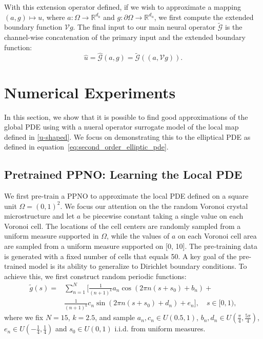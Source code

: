 \documentclass[preprint,11pt]{elsarticle}
\theoremstyle{plain}
\begin{document}
With this extension operator defined, if we wish to approximate a mapping $(a, g) \mapsto u$, where $a: \Omega \to \mathbb{R}^{d_a}$ and $g: \partial \Omega \to \mathbb{R}^{d_u}$, we first compute the extended boundary function $\mathcal{V}g$. The final input to our main neural operator $\tilde{\mathcal{G}}$ is the channel-wise concatenation of the primary input and the extended boundary function:
\begin{equation}
\hat{u} = \hat{\mathcal{G}}(a, g) = \tilde{\mathcal{G}}\left( (a, \mathcal{V}g) \right).
\end{equation}

\section{Numerical Experiments}
\label{sec:numerics}
In this section, we show that it is possible to find good approximations of the global PDE using with a nueral operator surrogate model of the local map defined in \ref{u-shaped}. We focus on demonstrating this to the elliptical PDE as defined in equation~\eqref{eq:second_order_elliptic_pde}.

\subsection{Pretrained PPNO: Learning the Local PDE}
\label{section4.1}
We first pre-train a PPNO to approximate the local PDE defined on a square unit $\Omega = (0,1)^2$. We focus our attention on the the random Voronoi crystal microstructure and let $a$ be piecewise constant taking a single value on each Voronoi cell. The locations of the cell centers are randomly sampled from a uniform measure supported in $\Omega$, while the values of $a$ on each Voronoi cell area are sampled from a uniform measure supported on [0, 10]. The pre-training data is generated with a fixed number of cells that equals 50. A key goal of the pre-trained model is its ability to generalize to Dirichlet boundary conditions. To achieve this, we first construct random periodic functions: 
\begin{align} \label{eq:random_boundary}
    \tilde{g}(s) = & \sum_{n=1}^N \Bigg[\frac{1}{(n+1)^k} a_n \cos(2\pi n (s+s_0) + b_n) + \\& \frac{1}{(n+1)^k} c_n \sin(2\pi n (s+s_0) + d_n) \nonumber + e_n \Bigg], \quad s\in [0, 1),
\end{align} 
where we fix $N = 15$, $k = 2.5$, and sample $a_n, c_n \in U(0.5, 1)$, $b_n, d_n \in U(\frac{\pi}{4}, \frac{5\pi}{4}) $, $e_n \in U(-\frac{1}{4},\frac{1}{4})$ and $s_0 \in U(0, 1)$ i.i.d. from uniform measures. 
\end{document}

